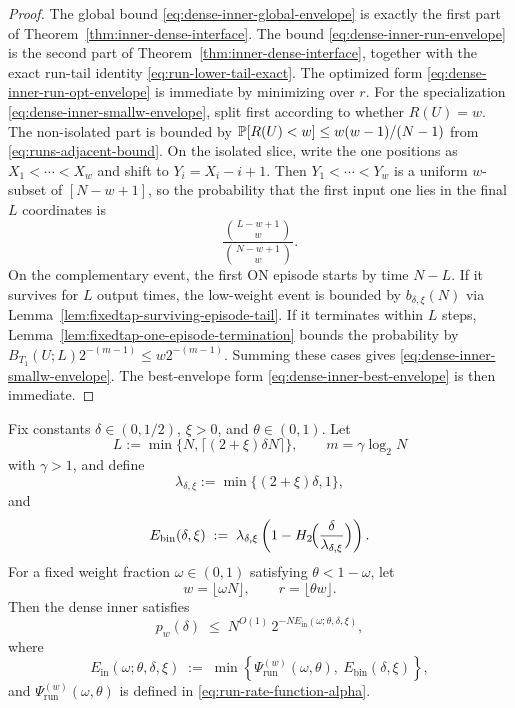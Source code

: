 \begin{proof}
The global bound \eqref{eq:dense-inner-global-envelope} is exactly the first part of
Theorem~\ref{thm:inner-dense-interface}.
The bound \eqref{eq:dense-inner-run-envelope} is the second part of
Theorem~\ref{thm:inner-dense-interface}, together with the exact run-tail identity
\eqref{eq:run-lower-tail-exact}.
The optimized form \eqref{eq:dense-inner-run-opt-envelope} is immediate by minimizing over $r$.
For the specialization \eqref{eq:dense-inner-smallw-envelope}, split first according to whether \(R(U)=w\). The
non-isolated part is bounded by \(\mathbb{P}[R(U)<w]\le w(w-1)/(N-1)\) from \eqref{eq:runs-adjacent-bound}. On the isolated
slice, write the one positions as \(X_1<\cdots<X_w\) and shift to \(Y_i=X_i-i+1\). Then \(Y_1<\cdots<Y_w\) is a
uniform \(w\)-subset of \([N-w+1]\), so the probability that the first input one lies in the final \(L\) coordinates is
\[
\frac{\binom{L-w+1}{w}}{\binom{N-w+1}{w}}.
\]
On the complementary event, the first ON episode starts by time \(N-L\). If it survives for \(L\) output times, the
low-weight event is bounded by \(b_{\delta,\xi}(N)\) via Lemma~\ref{lem:fixedtap-surviving-episode-tail}. If it
terminates within \(L\) steps, Lemma~\ref{lem:fixedtap-one-episode-termination} bounds the probability by
\(B_{T_1}(U;L)2^{-(m-1)}\le w2^{-(m-1)}\). Summing these cases gives
\eqref{eq:dense-inner-smallw-envelope}.
The best-envelope form \eqref{eq:dense-inner-best-envelope} is then immediate.
\end{proof}

\begin{theorem}
\label{prop:dense-inner-linear-exponent}
Fix constants $\delta\in(0,1/2)$, $\xi>0$, and $\theta\in(0,1)$.
Let
\[
L:=\min\{N,\lceil(2+\xi)\delta N\rceil\},
\qquad
m=\gamma\log_2 N
\]
with $\gamma>1$, and define
\[
\lambda_{\delta,\xi}
:=
\min\{(2+\xi)\delta,1\},
\]
and
\begin{equation}
\label{eq:dense-inner-binomial-exponent}
E_{\mathrm{bin}}(\delta,\xi)
\;:=\;
\lambda_{\delta,\xi}
\left(1-H_2\!\Bigl(\frac{\delta}{\lambda_{\delta,\xi}}\Bigr)\right).
\end{equation}
For a fixed weight fraction $\omega\in(0,1)$ satisfying $\theta<1-\omega$, let
\[
w=\lfloor \omega N\rfloor,
\qquad
r=\lfloor \theta w\rfloor.
\]
Then the dense inner satisfies
\begin{equation}
\label{eq:dense-inner-linear-exponent}
p_w(\delta)
\;\le\;
N^{O(1)}\,
2^{-N E_{\mathrm{in}}(\omega;\theta,\delta,\xi)},
\end{equation}
where
\begin{equation}
\label{eq:dense-inner-linear-rate-function}
E_{\mathrm{in}}(\omega;\theta,\delta,\xi)
\;:=\;
\min\!\left\{
\Psi_{\mathrm{run}}^{(w)}(\omega,\theta),\
E_{\mathrm{bin}}(\delta,\xi)
\right\},
\end{equation}
and $\Psi_{\mathrm{run}}^{(w)}(\omega,\theta)$ is defined in
\eqref{eq:run-rate-function-alpha}.
\end{theorem}

